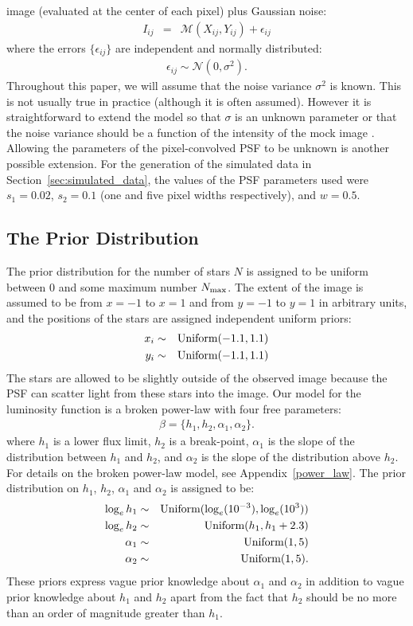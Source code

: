 \documentclass[manuscript]{aastex}
\begin{document}
image (evaluated at the center of each pixel) plus Gaussian noise:
\begin{eqnarray}
I_{ij} &=& \mathcal{M}(X_{ij}, Y_{ij}) + \epsilon_{ij}
\end{eqnarray}
where the errors $\{\epsilon_{ij}\}$ are independent and normally distributed:
\begin{eqnarray}
\epsilon_{ij} \sim \mathcal{N}(0, \sigma^2).
\end{eqnarray}
Throughout this paper, we will assume that the noise variance $\sigma^2$ is
known. This is not usually true in practice (although it is often assumed).
However it is straightforward to extend the model so that $\sigma$ is an
unknown parameter or that the noise variance should be a function of the
intensity of the mock image \citep[e.g.][]{2011MNRAS.412.2521B}. Allowing
the parameters of the pixel-convolved PSF to be unknown is another possible
extension. For the generation of the simulated data in Section~\ref{sec:simulated_data},
the values of the PSF parameters used were $s_1=0.02$, $s_2=0.1$ (one and
five pixel widths respectively), and $w=0.5$. 

\subsection{The Prior Distribution}
The prior distribution for the number of stars $N$ is assigned to be uniform between 0 and some maximum number $N_{\rm max}$. The extent of the image is assumed to be
from $x=-1$ to $x=1$ and from $y=-1$ to $y=1$ in arbitrary units, and the
positions of the stars are assigned independent uniform priors:
\begin{eqnarray}
x_i &\sim& \textnormal{Uniform}(-1.1, 1.1) \\
y_i &\sim& \textnormal{Uniform}(-1.1, 1.1)
\end{eqnarray}
The stars are allowed to be slightly outside of the observed image because the
PSF can scatter light from these stars into the image. Our model for the
luminosity function is a broken power-law with four
free parameters:
\begin{eqnarray}
\beta = \{h_1, h_2, \alpha_1, \alpha_2\}.
\end{eqnarray}
where $h_1$ is a lower flux limit, $h_2$ is a break-point, $\alpha_1$ is
the slope of the distribution between $h_1$ and $h_2$, and $\alpha_2$ is the
slope of the distribution above $h_2$. For details on the broken power-law
model, see Appendix~\ref{power_law}. The prior distribution on $h_1$, $h_2$,
$\alpha_1$ and $\alpha_2$ is assigned to be:
\begin{eqnarray}
\log_e h_1 &\sim& \textnormal{Uniform}(\log_e(10^{-3}), \log_e(10^3)) \\
\log_e h_2 &\sim& \textnormal{Uniform}(h_1, h_1 + 2.3) \\
\alpha_1 &\sim& \textnormal{Uniform}(1, 5) \\
\alpha_2 &\sim& \textnormal{Uniform}(1, 5).
\end{eqnarray}
These priors express vague prior knowledge about $\alpha_1$ and $\alpha_2$ in
addition to vague prior knowledge about $h_1$ and $h_2$ apart from the fact
that $h_2$ should be no more than an order of magnitude greater than $h_1$.
\end{document}

